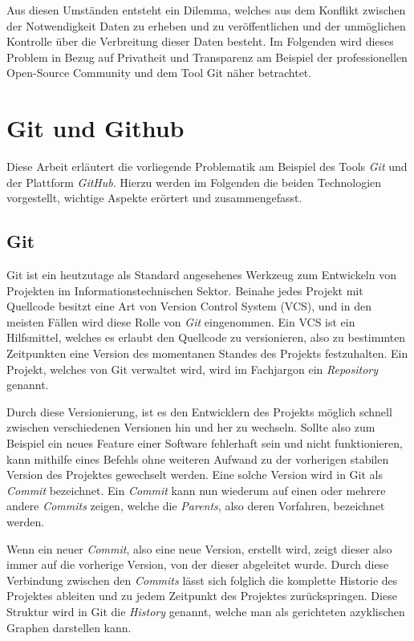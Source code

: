 \documentclass[12pt,a4paper]{article}
\begin{document}
Aus diesen Umständen entsteht ein Dilemma, welches aus dem Konflikt zwischen der Notwendigkeit Daten zu erheben und zu veröffentlichen und der unmöglichen Kontrolle über die Verbreitung dieser Daten besteht.
Im Folgenden wird dieses Problem in Bezug auf Privatheit und Transparenz am Beispiel der professionellen Open-Source Community und dem Tool Git näher betrachtet.

\section{Git und Github}
Diese Arbeit erläutert die vorliegende Problematik am Beispiel des Tools \emph{Git} und der Plattform \emph{GitHub}.
Hierzu werden im Folgenden die beiden Technologien vorgestellt, wichtige Aspekte erörtert und zusammengefasst.


\subsection{Git}
Git ist ein heutzutage als Standard angesehenes Werkzeug zum Entwickeln von Projekten im Informationstechnischen Sektor.
Beinahe jedes Projekt mit Quellcode besitzt eine Art von Version Control System (VCS), und in den meisten Fällen wird diese Rolle von \emph{Git} eingenommen.
Ein VCS ist ein Hilfsmittel, welches es erlaubt den Quellcode zu versionieren, also zu bestimmten Zeitpunkten eine Version des momentanen Standes des Projekts festzuhalten.
Ein Projekt, welches von Git verwaltet wird, wird im Fachjargon ein \emph{Repository} genannt.

Durch diese Versionierung, ist es den Entwicklern des Projekts möglich schnell zwischen verschiedenen Versionen hin und her zu wechseln.
Sollte also zum Beispiel ein neues Feature einer Software fehlerhaft sein und nicht funktionieren, kann mithilfe eines Befehls ohne weiteren Aufwand zu der vorherigen stabilen Version des Projektes gewechselt werden.
Eine solche Version wird in Git als \emph{Commit} bezeichnet.
Ein \emph{Commit} kann nun wiederum auf einen oder mehrere andere \emph{Commits} zeigen, welche die \emph{Parents}, also deren Vorfahren, bezeichnet werden.

Wenn ein neuer \emph{Commit}, also eine neue Version, erstellt wird, zeigt dieser also immer auf die vorherige Version, von der dieser abgeleitet wurde.
Durch diese Verbindung zwischen den \emph{Commits} lässt sich folglich die komplette Historie des Projektes ableiten und zu jedem Zeitpunkt des Projektes zurückspringen.
Diese Struktur wird in Git die \emph{History} genannt, welche man als gerichteten azyklischen Graphen darstellen kann.
\end{document}
